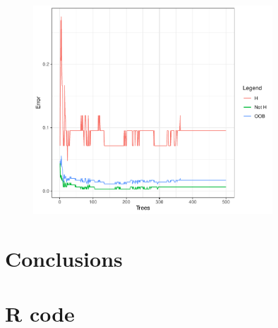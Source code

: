 \documentclass[
12pt, %
a4paper, %
oneside, %
headinclude,footinclude, %
BCOR5mm, %
]{scrartcl}
\begin{document}
\begin{figure}[h]
\begin{center}
\includegraphics[width=0.8\textwidth]{Pic/Random_forest_trees.pdf}
\caption{}
\label{Random_forest_trees}
\end{center}
\end{figure}



\clearpage

\section{Conclusions}

\clearpage

\section{R code}
\begin{lstlisting}


\end{lstlisting}




\renewcommand{\refname}{\spacedlowsmallcaps{References}} %




\end{document}
